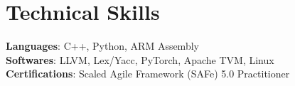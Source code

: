 \documentclass[letterpaper,11pt]{article}
\begin{document}
\section{Technical Skills}
 \begin{itemize}[leftmargin=0.15in, label={}]
    \small{\item{
     \textbf{Languages}{: C++, Python, ARM Assembly} \\
     \textbf{Softwares}{: LLVM, Lex/Yacc, PyTorch, Apache TVM, Linux} \\
     \textbf{Certifications}{: Scaled Agile Framework (SAFe) 5.0 Practitioner} \\
    }}
 \end{itemize}


\end{document}
